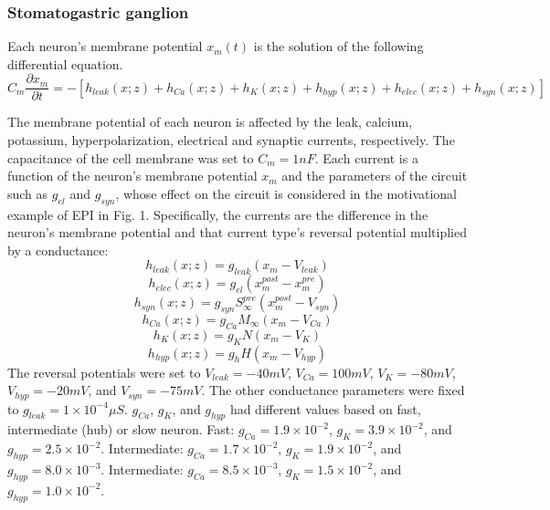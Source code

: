\documentclass[11pt]{article}
\begin{document}
\subsubsection{Stomatogastric ganglion}\label{methods_STG}
Each neuron's membrane potential $x_m(t)$ is the solution of the following differential equation.
\begin{equation} C_m \frac{\partial x_m}{\partial t} = - \left[ h_{leak}(x; z) + h_{Ca}(x; z) + h_K(x; z) + h_{hyp}(x; z) + h_{elec}(x; z) + h_{syn}(x; z)\right] 
\end{equation} 

The membrane potential of each neuron is affected by the leak, calcium, potassium, hyperpolarization,
electrical and synaptic currents, respectively.  The capacitance of the cell membrane was set to $C_m = 1nF$. Each current is a function of the neuron's membrane potential $x_m$ and the parameters of the circuit such as  $g_{el}$ and $g_{syn}$, whose effect on the circuit is considered in the motivational example of EPI in Fig. 1.  Specifically, the currents are the difference in the neuron's membrane potential and that current type's reversal potential multiplied by a conductance:
\begin{equation}  h_{leak}(x; z) = g_{leak} (x_m - V_{leak}) 
\end{equation} 
\begin{equation}  h_{elec}(x; z) = g_{el} (x_m^{post} - x_m^{pre})
\end{equation} 
\begin{equation}  h_{syn}(x; z) = g_{syn} S_\infty^{pre} (x_m^{post} - V_{syn}) \end{equation} 
\begin{equation}  h_{Ca}(x; z) = g_{Ca} M_\infty (x_m - V_{Ca}) 
\end{equation} 
\begin{equation}  h_K(x; z) = g_K N (x_m - V_K) 
\end{equation} 
\begin{equation}  h_{hyp}(x; z) = g_h H(x_m - V_{hyp})
\end{equation} 
The reversal potentials were set to $V_{leak} = -40mV$, $V_{Ca} = 100mV$, $V_K = -80mV$, $V_{hyp} = -20mV$, and $V_{syn} = -75mV$.  The other conductance parameters were fixed to $g_{leak} = 1 \times 10^{-4} \mu S$. $g_{Ca}$, $g_{K}$, and $g_{hyp}$ had different values based on fast, intermediate (hub) or slow neuron.  Fast: $g_{Ca} = 1.9 \times 10^{-2}$, $ g_K = 3.9 \times 10^{-2} $, and $ g_{hyp} = 2.5 \times 10^{-2} $.  Intermediate: $g_{Ca} = 1.7 \times 10^{-2}$, $ g_K = 1.9 \times 10^{-2} $, and $ g_{hyp} = 8.0 \times 10^{-3} $.  Intermediate: $g_{Ca} = 8.5 \times 10^{-3}$, $ g_K = 1.5 \times 10^{-2} $, and $ g_{hyp} = 1.0 \times 10^{-2} $.
\end{document}
